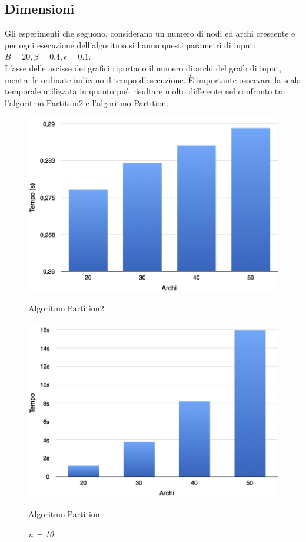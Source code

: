 \subsection{Dimensioni}
Gli esperimenti che seguono, considerano un numero di nodi ed archi crescente e per ogni esecuzione dell'algoritmo si hanno questi parametri di input: $B = 20, \beta = 0.4, \epsilon = 0.1$.\\
L'asse delle ascisse dei grafici riportano il numero di archi del grafo di input, mentre le ordinate indicano il tempo d'esecuzione. È importante osservare la scala temporale utilizzata in quanto può risultare molto differente nel confronto tra l'algoritmo Partition2 e l'algoritmo Partition.
\begin{figure}[h!]
	\vspace*{1cm}
	\begin{minipage}{0.40\textwidth}
		\centering
		\includegraphics[scale=.25]{img/beta4/10_4.jpg}
		\caption{Algoritmo Partition2}
	\end{minipage}\hfill
	\begin{minipage}{0.40\textwidth}
		\centering
		\includegraphics[scale=.25]{img/iole_beta4/iole_10_4.jpg}
		\caption{Algoritmo Partition}
	\end{minipage}
	\caption*{\textit{n = 10}}
\end{figure}
